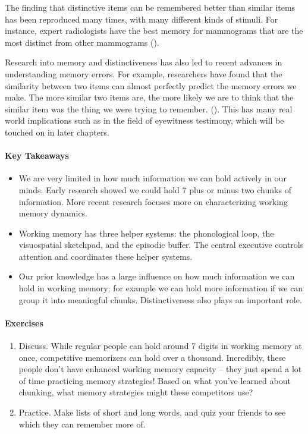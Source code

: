 \documentclass[
]{krantz}
\providecommand{\tightlist}{%
  \setlength{\itemsep}{0pt}\setlength{\parskip}{0pt}}
\begin{document}
The finding that distinctive items can be remembered better than similar items has been reproduced many times, with many different kinds of stimuli. For instance, expert radiologists have the best memory for mammograms that are the most distinct from other mammograms ().

Research into memory and distinctiveness has also led to recent advances in understanding memory errors. For example, researchers have found that the similarity between two items can almost perfectly predict the memory errors we make. The more similar two items are, the more likely we are to think that the similar item was the thing we were trying to remember. (). This has many real world implications such as in the field of eyewitness testimony, which will be touched on in later chapters.

\paragraph*{Key Takeaways}\label{key-takeaways-3}

\begin{itemize}
\tightlist
\item
  We are very limited in how much information we can hold actively in our minds. Early research showed we could hold 7 plus or minus two chunks of information. More recent research focuses more on characterizing working memory dynamics.
\item
  Working memory has three helper systems: the phonological loop, the visuospatial sketchpad, and the episodic buffer. The central executive controls attention and coordinates these helper systems.
\item
  Our prior knowledge has a large influence on how much information we can hold in working memory; for example we can hold more information if we can group it into meaningful chunks. Distinctiveness also plays an important role.
\end{itemize}

\paragraph*{Exercises}\label{exercises-3}

\begin{enumerate}
\def\labelenumi{\arabic{enumi}.}
\tightlist
\item
  Discuss. While regular people can hold around 7 digits in working memory at once, competitive memorizers can hold over a thousand. Incredibly, these people don't have enhanced working memory capacity -- they just spend a lot of time practicing memory strategies! Based on what you've learned about chunking, what memory strategies might these competitors use?
\item
  Practice. Make lists of short and long words, and quiz your friends to see which they can remember more of.
\end{enumerate}
\end{document}
